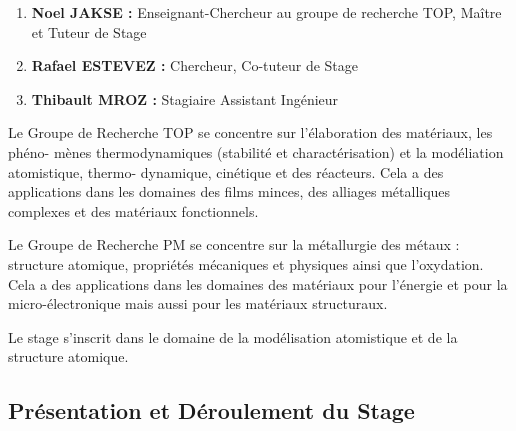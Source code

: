         \begin{enumerate}[\hspace{3em}$\bullet$]
            \item \textbf{Noel JAKSE : }Enseignant-Chercheur au groupe de recherche TOP, Maître et Tuteur de Stage
            \item \textbf{Rafael ESTEVEZ : }Chercheur, Co-tuteur de Stage
            \item \textbf{Thibault MROZ : }Stagiaire Assistant Ingénieur
        \end{enumerate}

        Le Groupe de Recherche TOP se concentre sur l'élaboration des matériaux, les phéno-
        mènes thermodynamiques (stabilité et charactérisation) et la modéliation atomistique, thermo-
        dynamique, cinétique et des réacteurs. Cela a des applications dans les domaines des films minces, des alliages métalliques complexes et des matériaux fonctionnels.

        Le Groupe de Recherche PM se concentre sur la métallurgie des métaux : structure atomique, propriétés mécaniques et physiques ainsi que l'oxydation. Cela a des applications dans les domaines des matériaux pour l'énergie et pour la micro-électronique mais aussi pour les matériaux structuraux. 

        Le stage s'inscrit dans le domaine de la modélisation atomistique et de la structure atomique. 

    \subsection{Présentation et Déroulement du Stage}